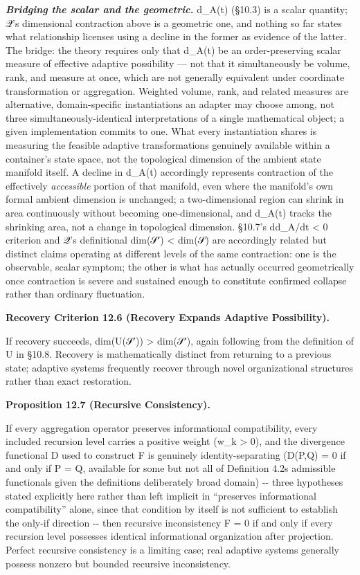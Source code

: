 \documentclass[
]{article}
\begin{document}
\emph{\textbf{Bridging the scalar and the geometric.}} d\_A(t) (§10.3)
is a scalar quantity; 𝒬's dimensional contraction above is a geometric
one, and nothing so far states what relationship licenses using a
decline in the former as evidence of the latter. The bridge: the theory
requires only that d\_A(t) be an order-preserving scalar measure of
effective adaptive possibility --- not that it simultaneously be volume,
rank, and measure at once, which are not generally equivalent under
coordinate transformation or aggregation. Weighted volume, rank, and
related measures are alternative, domain-specific instantiations an
adapter may choose among, not three simultaneously-identical
interpretations of a single mathematical object; a given implementation
commits to one. What every instantiation shares is measuring the
feasible adaptive transformations genuinely available within a
container's state space, not the topological dimension of the ambient
state manifold itself. A decline in d\_A(t) accordingly represents
contraction of the effectively \emph{accessible} portion of that
manifold, even where the manifold's own formal ambient dimension is
unchanged; a two-dimensional region can shrink in area continuously
without becoming one-dimensional, and d\_A(t) tracks the shrinking area,
not a change in topological dimension. §10.7's dd\_A/dt \textless{} 0
criterion and 𝒬's definitional dim(𝒮′) \textless{} dim(𝒮) are
accordingly related but distinct claims operating at different levels of
the same contraction: one is the observable, scalar symptom; the other
is what has actually occurred geometrically once contraction is severe
and sustained enough to constitute confirmed collapse rather than
ordinary fluctuation.

\textbf{Recovery Criterion 12.6 (Recovery Expands Adaptive
Possibility).}

If recovery succeeds, dim(U(𝒮′)) \textgreater{} dim(𝒮′), again following
from the definition of U in §10.8. Recovery is mathematically distinct
from returning to a previous state; adaptive systems frequently recover
through novel organizational structures rather than exact restoration.

\textbf{Proposition 12.7 (Recursive Consistency).}

If every aggregation operator preserves informational compatibility,
every included recursion level carries a positive weight (w\_k
\textgreater{} 0), and the divergence functional D used to construct F
is genuinely identity-separating (D(P,Q) = 0 if and only if P = Q,
available for some but not all of Definition 4.2\textquotesingle s
admissible functionals given the definition\textquotesingle s
deliberately broad domain) -\/- three hypotheses stated explicitly here
rather than left implicit in ``preserves informational compatibility''
alone, since that condition by itself is not sufficient to establish the
only-if direction -\/- then recursive inconsistency F = 0 if and only if
every recursion level possesses identical informational organization
after projection. Perfect recursive consistency is a limiting case; real
adaptive systems generally possess nonzero but bounded recursive
inconsistency.
\end{document}
